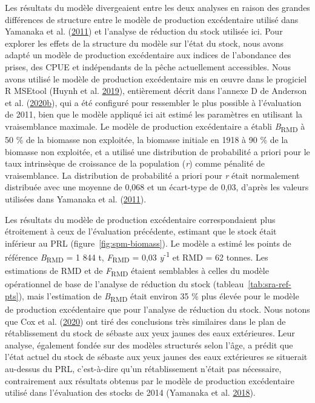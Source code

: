 \documentclass[french,11pt]{book}
\begin{document}
Les résultats du modèle divergeaient entre les deux analyses en raison des grandes différences de structure entre le modèle de production excédentaire utilisé dans Yamanaka et al. (\protect\hyperlink{ref-yamanaka2011}{2011}) et l'analyse de réduction du stock utilisée ici. Pour explorer les effets de la structure du modèle sur l'état du stock, nous avons adapté un modèle de production excédentaire aux indices de l'abondance des prises, des CPUE et indépendants de la pêche actuellement accessibles. Nous avons utilisé le modèle de production excédentaire mis en œuvre dans le progiciel R MSEtool (Huynh et al. \protect\hyperlink{ref-huynh_msetool_2019}{2019}), entièrement décrit dans l'annexe D de Anderson et al. (\protect\hyperlink{ref-anderson2020gfmp}{2020}\protect\hyperlink{ref-anderson2020gfmp}{b}), qui a été configuré pour ressembler le plus possible à l'évaluation de 2011, bien que le modèle appliqué ici ait estimé les paramètres en utilisant la vraisemblance maximale. Le modèle de production excédentaire a établi \emph{B}\textsubscript{RMD} à 50 \% de la biomasse non exploitée, la biomasse initiale en 1918 à 90 \% de la biomasse non exploitée, et a utilisé une distribution de probabilité a priori pour le taux intrinsèque de croissance de la population (\emph{r}) comme pénalité de vraisemblance. La distribution de probabilité a priori pour \emph{r} était normalement distribuée avec une moyenne de 0,068 et un écart-type de 0,03, d'après les valeurs utilisées dans Yamanaka et al. (\protect\hyperlink{ref-yamanaka2011}{2011}).

Les résultats du modèle de production excédentaire correspondaient plus étroitement à ceux de l'évaluation précédente, estimant que le stock était inférieur au PRL (figure~\ref{fig:spm-biomass}). Le modèle a estimé les points de référence \emph{B}\textsubscript{RMD} = 1 844 t, \emph{F}\textsubscript{RMD} = 0,03 \emph{y}\textsuperscript{-1} et RMD = 62 tonnes. Les estimations de RMD et de \emph{F}\textsubscript{RMD} étaient semblables à celles du modèle opérationnel de base de l'analyse de réduction du stock (tableau~\ref{tab:sra-ref-pts}), mais l'estimation de \emph{B}\textsubscript{RMD} était environ 35 \% plus élevée pour le modèle de production excédentaire que pour l'analyse de réduction du stock. Nous notons que Cox et al. (\protect\hyperlink{ref-cox2020}{2020}) ont tiré des conclusions très similaires dans le plan de rétablissement du stock de sébaste aux yeux jaunes des eaux extérieures. Leur analyse, également fondée sur des modèles structurés selon l'âge, a prédit que l'état actuel du stock de sébaste aux yeux jaunes des eaux extérieures se situerait au-dessus du PRL, c'est-à-dire qu'un rétablissement n'était pas nécessaire, contrairement aux résultats obtenus par le modèle de production excédentaire utilisé dans l'évaluation des stocks de 2014 (Yamanaka et al. \protect\hyperlink{ref-yamanaka2018yelloweyeoutside}{2018}).
\end{document}
